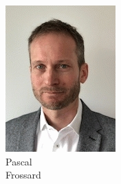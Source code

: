 \documentclass[aspectratio=169]{beamer}
\begin{document}
\begin{frame}
\begin{figure}
\begin{subfigure}[b]{0.14\linewidth}
			\includegraphics[width=\linewidth]{picture_pascal}
			\caption*{Pascal\\Frossard}
		\end{subfigure}
		\hfill
		\begin{subfigure}[b]{0.14\linewidth}

\end{subfigure}
\end{figure}
\end{frame}
\end{document}

